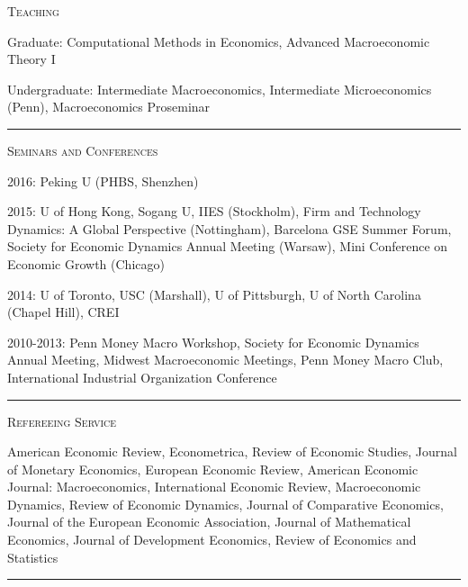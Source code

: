 \documentclass{article}
\begin{document}
\parbox{\textwidth}{
\parbox[t]{0.28\textwidth}{ \raggedright \noindent \textsc{ Teaching } }
\parbox[t]{0.72\textwidth}{ \raggedright

Graduate: Computational Methods in Economics, Advanced Macroeconomic Theory I
\vspace{0.27cm}

Undergraduate: Intermediate Macroeconomics, Intermediate Microeconomics (Penn), Macroeconomics Proseminar
\vspace{0.27cm}

}
\textcolor{light-gray}{\hrule}
}
\vspace{0.3cm}

\parbox{\textwidth}{
\parbox[t]{0.28\textwidth}{ \raggedright \noindent \textsc{ Seminars and Conferences } }
\parbox[t]{0.72\textwidth}{ \raggedright

2016: Peking U (PHBS, Shenzhen)
\vspace{0.27cm}

2015: U of Hong Kong, Sogang U, IIES (Stockholm), Firm and Technology Dynamics: A Global Perspective (Nottingham), Barcelona GSE Summer Forum, Society for Economic Dynamics Annual Meeting (Warsaw), Mini Conference on Economic Growth (Chicago)
\vspace{0.27cm}

2014: U of Toronto, USC (Marshall), U of Pittsburgh, U of North Carolina (Chapel Hill), CREI
\vspace{0.27cm}

2010-2013: Penn Money Macro Workshop, Society for Economic Dynamics Annual Meeting, Midwest Macroeconomic Meetings, Penn Money Macro Club, International Industrial Organization Conference
\vspace{0.27cm}

}
\textcolor{light-gray}{\hrule}
}
\vspace{0.3cm}

\parbox{\textwidth}{
\parbox[t]{0.28\textwidth}{ \raggedright \noindent \textsc{ Refereeing Service } }
\parbox[t]{0.72\textwidth}{ \raggedright

American Economic Review, Econometrica, Review of Economic Studies, Journal of Monetary Economics, European Economic Review, American Economic Journal: Macroeconomics, International Economic Review, Macroeconomic Dynamics, Review of Economic Dynamics, Journal of Comparative Economics, Journal of the European Economic Association, Journal of Mathematical Economics, Journal of Development Economics, Review of Economics and Statistics
\vspace{0.27cm}

}
\textcolor{light-gray}{\hrule}
}
\vspace{0.3cm}
\end{document}
